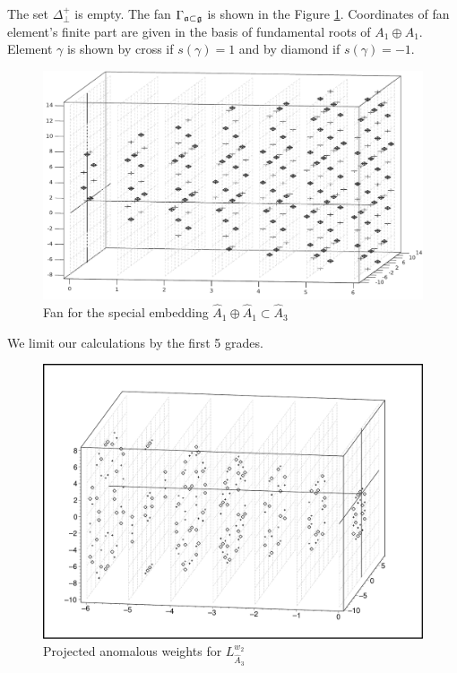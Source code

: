 \documentclass[a4paper,12pt]{article}
\theoremstyle{definition} \newtheorem{Def}{Definition}
\begin{document}
The set $\Delta^{+}_{\bot}$ is empty. 
The fan $\Gamma _{\frak{a}\subset \frak{g}}$ is shown in the Figure \ref{fig:A1+A1-A3_fan}. Coordinates of fan element's finite part are given in the basis of fundamental roots of $A_1\oplus A_1$. Element $\gamma$ is shown by cross if  $s(\gamma)=1$ and by diamond if $s(\gamma)=-1$.
\begin{figure}[h!tb]
  \includegraphics[width=135mm]{A1+A1-A3_fan.pdf}
  \caption{Fan for the special embedding $\hat A_1\oplus\hat A_1\subset\hat A_3$}
  \label{fig:A1+A1-A3_fan}
\end{figure}

We limit our calculations by the first 5 grades.
\begin{figure}[p]
  \includegraphics[width=135mm]{A1+A1-A3_anom.pdf}
  \caption{Projected anomalous weights for $L^{w_2}_{\hat A_3}$}
  \label{fig:A1+A1-A3_anom}
\end{figure}
\end{document}
